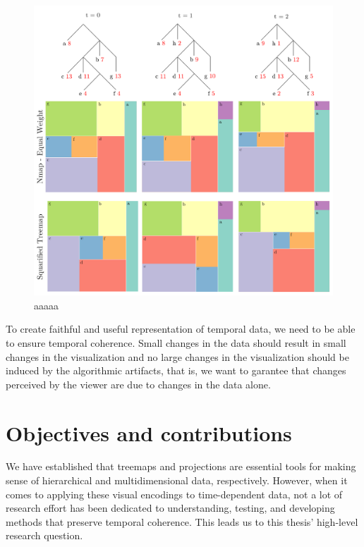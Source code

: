 \begin{figure}[h]
    \centering
    \includegraphics[width=\linewidth]{figures/intro/mov_sub_new.png}
    \caption{aaaaa}
    \label{fig:intro-tm-demo-instability}
\end{figure}

To create faithful and useful representation of temporal data, we need to be able to ensure temporal coherence. Small changes in the data should result in small changes in the visualization and no large changes in the visualization should be induced by the algorithmic artifacts, that is, we want to garantee that changes perceived by the viewer are due to changes in the data alone.


\section{Objectives and contributions}

We have established that treemaps and projections are essential tools for making sense of hierarchical and multidimensional data, respectively. However, when it comes to applying these visual encodings to time-dependent data, not a lot of research effort has been dedicated to understanding, testing, and developing methods that preserve temporal coherence. This leads us to this thesis' high-level research question.

